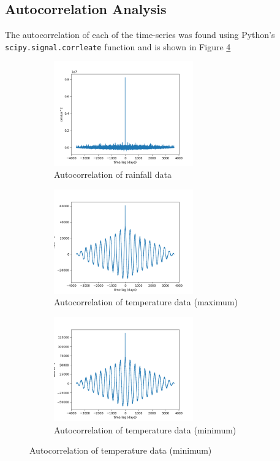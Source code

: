 \documentclass{article}
\begin{document}
\newpage
\subsection{Autocorrelation Analysis}
The autocorrelation of each of the time-series was found using Python's \texttt{scipy.signal.corrleate} function and is shown in Figure \ref{fig:autocorrelation_analysis}

\begin{figure}[h!]
	\caption{Autocorrelation of each dataset}
	\begin{subfigure}{\textwidth}
		\includegraphics[width=\linewidth, height=4.5cm]{figures/auto_correlation_rainfall.png} 
		\caption{Autocorrelation of rainfall data}
		\label{fig:acm_rainfall}
	\end{subfigure}
	\begin{subfigure}{\textwidth}
		\includegraphics[width=\linewidth, height=4.5cm]{figures/auto_correlation_max_temp.png}
		\caption{Autocorrelation of temperature data (maximum)}	
		\label{fig:ac_max_temp}
	\end{subfigure}
	\begin{subfigure}{\textwidth}
		\includegraphics[width=\linewidth, height=4.5cm]{figures/auto_correlation_min_temp.png}
		\caption{Autocorrelation of temperature data (minimum)}	
		\label{fig:ac_min_temp}
	\end{subfigure}
	\label{fig:autocorrelation_analysis}
\end{figure}
\end{document}
